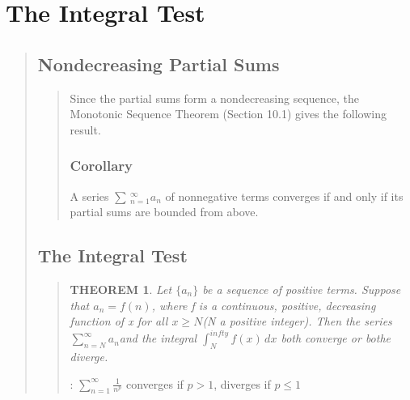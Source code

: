 \documentclass{report}
\newtheorem{theorem}{THEOREM}
\begin{document}

\section{The Integral Test }
\begin{quote}

	\subsection{Nondecreasing Partial Sums}
	\begin{quote}
		Since the partial sums form a nondecreasing sequence, the Monotonic Sequence Theorem (Section 10.1) gives the following result.
		\subsubsection{Corollary}
		A series $\sum \,_{n=1}^{\infty} a_n$ of nonnegative terms converges if and only if its partial sums are bounded from above.
	\end{quote}
	
	\subsection{The Integral Test}
	\begin{quote}
		\begin{theorem}
			Let $\{a_n\}$ be a sequence of positive terms. Suppose that $a_n = f(n)$, where f is a continuous, positive, decreasing function of x for all $x\geq N$(N a positive integer). Then the series $\sum_{n=N}^{\infty}a_n$and the integral $\int_{N}^{infty}f(x)\,dx$ both converge or bothe diverge.
		\end{theorem}

		\begin{info}[p-series]
			: $\sum_{n=1}^{\infty}\frac{1}{n^p}$ converges if $p>1$, diverges if $p\leq 1$
		\end{info}

	\end{quote}

\end{quote}

\end{document}
